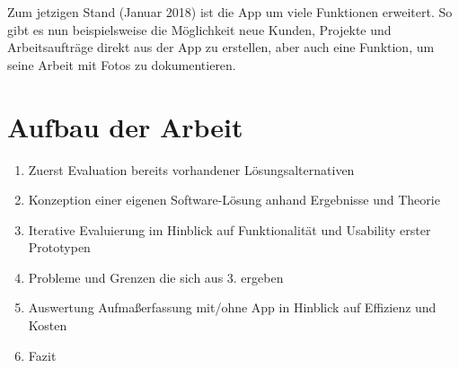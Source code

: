 Zum jetzigen Stand (Januar 2018) ist die App um viele Funktionen erweitert. So gibt es nun beispielsweise die Möglichkeit neue Kunden, Projekte und Arbeitsaufträge direkt aus der App zu erstellen, aber auch eine Funktion, um seine Arbeit mit Fotos zu dokumentieren. 

\section{Aufbau der Arbeit}
\begin{enumerate}
	\item Zuerst Evaluation bereits vorhandener Lösungsalternativen
	\item Konzeption einer eigenen Software-Lösung anhand Ergebnisse und Theorie
	\item Iterative Evaluierung im Hinblick auf Funktionalität und Usability erster Prototypen
	\item Probleme und Grenzen die sich aus 3. ergeben
	\item Auswertung Aufmaßerfassung mit/ohne App in Hinblick auf Effizienz und Kosten
	\item Fazit
\end{enumerate}
